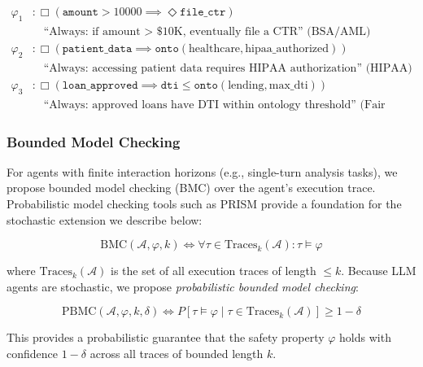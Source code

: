 \documentclass[11pt,a4paper]{article}
\newcommand{\agent}{\mathcal{A}}
\newcommand{\prop}{\varphi}
\begin{document}
\begin{tcolorbox}[title=Example Safety Properties,
  colback=red!5, colframe=red!40]
\small
\begin{align*}
  \prop_1 &: \Box(\texttt{amount} > 10000 \implies
    \Diamond \texttt{file\_ctr}) \\
  &\quad \text{``Always: if amount > \$10K, eventually file a CTR''
    (BSA/AML)} \\[4pt]
  \prop_2 &: \Box(\texttt{patient\_data} \implies
    \texttt{onto}(\text{healthcare}, \text{hipaa\_authorized})) \\
  &\quad \text{``Always: accessing patient data requires HIPAA
    authorization'' (HIPAA)} \\[4pt]
  \prop_3 &: \Box(\texttt{loan\_approved} \implies
    \texttt{dti} \leq \texttt{onto}(\text{lending},
    \text{max\_dti})) \\
  &\quad \text{``Always: approved loans have DTI within ontology
    threshold'' (Fair Lending)}
\end{align*}
\end{tcolorbox}

\subsubsection{Bounded Model Checking}

For agents with finite interaction horizons (e.g., single-turn
analysis tasks), we propose bounded model checking (BMC)
\citep{biere2003bounded} over the agent's execution trace.
Probabilistic model checking tools such as PRISM
\citep{kwiatkowska2011prism} provide a foundation for the
stochastic extension we describe below:

\begin{equation}
  \text{BMC}(\agent, \prop, k) \iff \forall \tau \in
    \text{Traces}_k(\agent): \tau \models \prop
\end{equation}

\noindent where $\text{Traces}_k(\agent)$ is the set of all
execution traces of length $\leq k$. Because LLM agents are
stochastic, we propose \emph{probabilistic bounded model checking}:

\begin{equation}
  \text{PBMC}(\agent, \prop, k, \delta) \iff
    P[\tau \models \prop \mid \tau \in \text{Traces}_k(\agent)]
    \geq 1 - \delta
\end{equation}

This provides a probabilistic guarantee that the safety property
$\prop$ holds with confidence $1 - \delta$ across all traces of
bounded length $k$.
\end{document}
